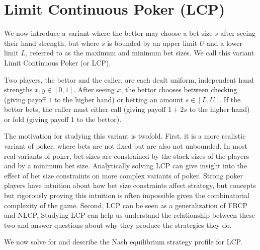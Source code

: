 \documentclass[../../main/main.tex]{subfiles}
\begin{document}
\section{Limit Continuous Poker (LCP)}
We now introduce a variant where the bettor may choose a bet size $s$ after seeing their hand strength, but where $s$ is bounded by an upper limit $U$ and a lower limit $L$, referred to as the maximum and minimum bet sizes. We call this variant  Limit Continuous Poker (or LCP).

\begin{definition}[LCP]
Two players, the bettor and the caller, are each dealt uniform, independent hand strengths $x, y \in [0, 1]$. After seeing $x$, the bettor chooses between checking (giving payoff $1$ to the higher hand) or betting an amount $s \in [L, U]$. If the bettor bets, the caller must either call (giving payoff $1+2s$ to the higher hand) or fold (giving payoff $1$ to the bettor).
\end{definition}

The motivation for studying this variant is twofold. First, it is a more realistic variant of poker, where bets are not fixed but are also not unbounded. In most real variants of poker, bet sizes are constrained by the stack sizes of the players and by a minimum bet size. Analytically solving LCP can give insight into the effect of bet size constraints on more complex variants of poker. Strong poker players have intuition about how bet size constraints affect strategy, but concepts but rigorously proving this intuition is often impossible given the combinatorial complexity of the game. Second, LCP can be seen as a generalization of FBCP and NLCP. Studying LCP can help us understand the relationship between these two and answer questions about why they produce the strategies they do.

We now solve for and describe the Nash equilibrium strategy profile for LCP.
\end{document}
